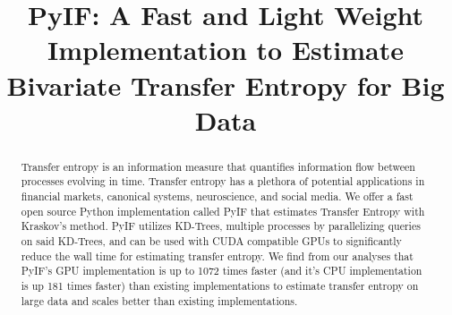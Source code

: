 \documentclass[conference]{IEEEtran}
\begin{document}
\title{PyIF: A Fast and Light Weight Implementation to Estimate Bivariate Transfer Entropy for Big Data
}

\author{
\and
{}
\and
{}
\and
{}
}

\maketitle

\begin{abstract}
Transfer entropy is an information measure that quantifies information flow between processes evolving in time. Transfer entropy has a plethora of potential applications in financial markets, canonical systems, neuroscience, and social media. We offer a fast open source Python implementation called PyIF that estimates Transfer Entropy with Kraskov's method. PyIF utilizes KD-Trees, multiple processes by parallelizing queries on said KD-Trees, and can be used with CUDA compatible GPUs to significantly reduce the wall time for estimating transfer entropy. We find from our analyses that PyIF's GPU implementation is up to 1072 times faster (and it's CPU implementation is up 181 times faster) than existing implementations to estimate transfer entropy on large data and scales better than existing implementations.
\end{abstract}
\end{document}
